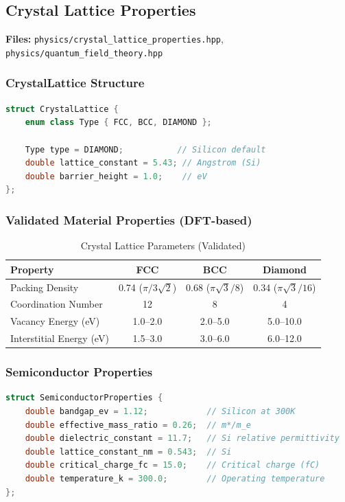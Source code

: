 \documentclass[11pt,a4paper]{article}
\begin{document}
\subsection{Crystal Lattice Properties}

\textbf{Files:} \texttt{physics/crystal\_lattice\_properties.hpp}, \texttt{physics/quantum\_field\_theory.hpp}

\subsubsection{CrystalLattice Structure}

\begin{lstlisting}[language=C++, basicstyle=\footnotesize\ttfamily]
struct CrystalLattice {
    enum class Type { FCC, BCC, DIAMOND };

    Type type = DIAMOND;           // Silicon default
    double lattice_constant = 5.43; // Angstrom (Si)
    double barrier_height = 1.0;    // eV
};
\end{lstlisting}

\subsubsection{Validated Material Properties (DFT-based)}

\begin{table}[htbp]
\centering
\caption{Crystal Lattice Parameters (Validated)}
\begin{tabular}{@{}lccc@{}}
\toprule
\textbf{Property} & \textbf{FCC} & \textbf{BCC} & \textbf{Diamond} \\
\midrule
Packing Density & 0.74 ($\pi/3\sqrt{2}$) & 0.68 ($\pi\sqrt{3}/8$) & 0.34 ($\pi\sqrt{3}/16$) \\
Coordination Number & 12 & 8 & 4 \\
Vacancy Energy (eV) & 1.0--2.0 & 2.0--5.0 & 5.0--10.0 \\
Interstitial Energy (eV) & 1.5--3.0 & 3.0--6.0 & 6.0--12.0 \\
\bottomrule
\end{tabular}
\end{table}

\subsubsection{Semiconductor Properties}

\begin{lstlisting}[language=C++, basicstyle=\footnotesize\ttfamily]
struct SemiconductorProperties {
    double bandgap_ev = 1.12;            // Silicon at 300K
    double effective_mass_ratio = 0.26;  // m*/m_e
    double dielectric_constant = 11.7;   // Si relative permittivity
    double lattice_constant_nm = 0.543;  // Si
    double critical_charge_fc = 15.0;    // Critical charge (fC)
    double temperature_k = 300.0;        // Operating temperature
};
\end{lstlisting}
\end{document}
